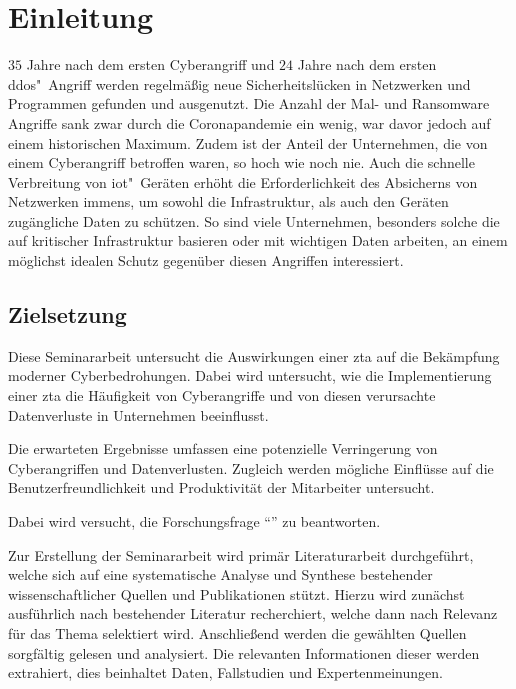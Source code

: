 \section{Einleitung}\label{sec:einleitung}

$35$ Jahre nach dem ersten Cyberangriff\autocite[\vglf][]{shackelford-2018} und $24$ Jahre nach dem ersten \ac{ddos}"~Angriff\autocite[\vglf][]{mit-2019} werden regelmäßig neue Sicherheitslücken in Netzwerken und Programmen gefunden und ausgenutzt.
Die Anzahl der Mal- und Ransomware Angriffe sank zwar durch die Coronapandemie ein wenig, war davor jedoch auf einem historischen Maximum.\autocites[][]{statista-malware}[][]{statista-ransomware}
Zudem ist der Anteil der Unternehmen, die von einem Cyberangriff betroffen waren, so hoch wie noch nie.\autocite{statista-share-ransomware}
Auch die schnelle Verbreitung von \ac{iot}"~Geräten erhöht die Erforderlichkeit des Absicherns von Netzwerken immens, um sowohl die Infrastruktur, als auch den Geräten zugängliche Daten zu schützen.\autocite[\vglf][]{syed:2022}
So sind viele Unternehmen, besonders solche die auf kritischer Infrastruktur basieren oder mit wichtigen Daten arbeiten, an einem möglichst idealen Schutz gegenüber diesen Angriffen interessiert.



\subsection{Zielsetzung}\label{subsec:zielsetzung}
Diese Seminararbeit untersucht die Auswirkungen einer \ac{zta} auf die Bekämpfung moderner Cyberbedrohungen.
Dabei wird untersucht, wie die Implementierung einer \ac{zta} die Häufigkeit von Cyberangriffe und von diesen verursachte Datenverluste in Unternehmen beeinflusst.

Die erwarteten Ergebnisse umfassen eine potenzielle Verringerung von Cyberangriffen und Datenverlusten.
Zugleich werden mögliche Einflüsse auf die Benutzerfreundlichkeit und Produktivität der Mitarbeiter untersucht.

Dabei wird versucht, die Forschungsfrage \enquote{\myForschungsfrage} zu beantworten.

Zur Erstellung der Seminararbeit wird primär Literaturarbeit durchgeführt, welche sich auf eine systematische Analyse und Synthese bestehender wissenschaftlicher Quellen und Publikationen stützt\autocite[\vglf][]{fink-2019}.
Hierzu wird zunächst ausführlich nach bestehender Literatur recherchiert, welche dann nach Relevanz für das Thema selektiert wird.
Anschließend werden die gewählten Quellen sorgfältig gelesen und analysiert.
Die relevanten Informationen dieser werden extrahiert, dies beinhaltet Daten, Fallstudien und Expertenmeinungen.

